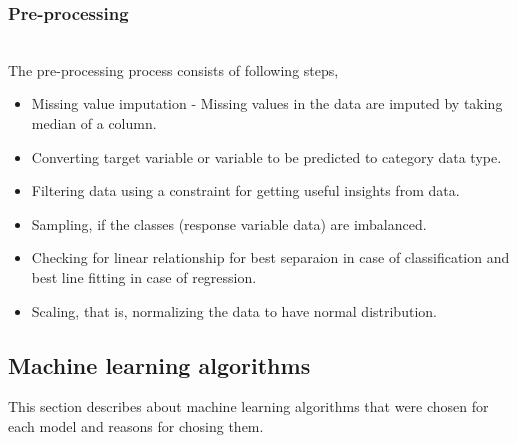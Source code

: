 \documentclass[format=sigconf]{acmart}
\begin{document}
\subsubsection{Pre-processing}
\hfill\\
The pre-processing process consists of following steps,
\begin{itemize}
    \item Missing value imputation - Missing values in the data are imputed by taking median of a column.
    \item Converting target variable or variable to be predicted to category data type.
    \item Filtering data using a constraint for getting useful insights from data.
    \item Sampling, if the classes (response variable data) are imbalanced.
    \item Checking for linear relationship for best separaion in case of classification and best line fitting in case of regression.
    \item Scaling, that is, normalizing the data to have normal distribution.
\end{itemize}
\subsection{Machine learning algorithms}
This section describes about machine learning algorithms that were chosen for each model and reasons for chosing them.
\end{document}
